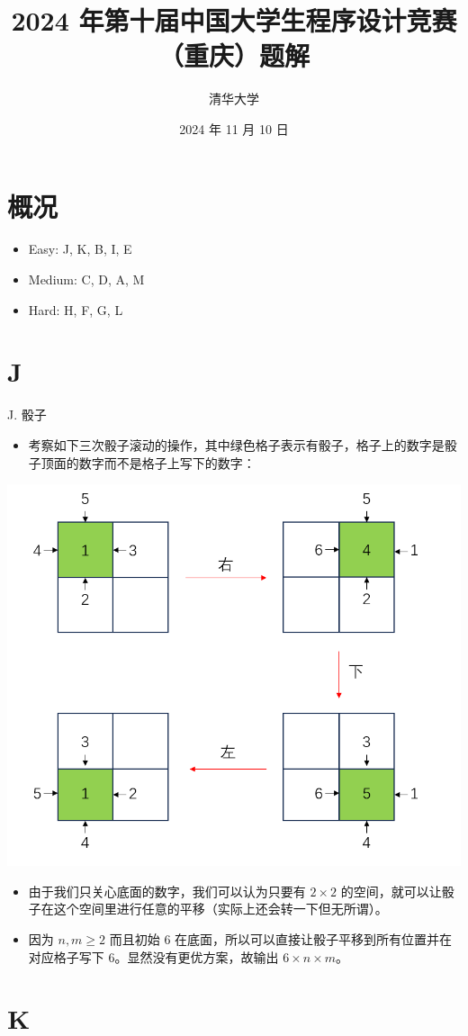 \documentclass[9pt]{ctexbeamer}
\title{2024 年第十届中国大学生程序设计竞赛（重庆）题解}
\author{清华大学}
\date{2024 年 11 月 10 日}
\newcommand{\setParDis}{\setlength{\parskip}{6pt}}
\begin{document}
\frame{\titlepage}

\section*{概况}

\begin{frame}
\setParDis
\begin{itemize}
	\item Easy: J, K, B, I, E
	\item Medium: C, D, A, M
	\item Hard: H, F, G, L
\end{itemize}
\end{frame}

\section{J}

\begin{frame}
\setParDis

J. 骰子

\begin{itemize}
	\item 考察如下三次骰子滚动的操作，其中绿色格子表示有骰子，格子上的数字是骰子顶面的数字而不是格子上写下的数字：
\end{itemize}
\centering\includegraphics[width = 0.3 \textwidth]{J.png}
\begin{itemize}
	\item 由于我们只关心底面的数字，我们可以认为只要有 $2 \times 2$ 的空间，就可以让骰子在这个空间里进行任意的平移（实际上还会转一下但无所谓）。
	\item 因为 $n,m \ge 2$ 而且初始 6 在底面，所以可以直接让骰子平移到所有位置并在对应格子写下 6。显然没有更优方案，故输出 $6 \times n \times m$。
\end{itemize}

\end{frame}

\section{K}
\end{document}
